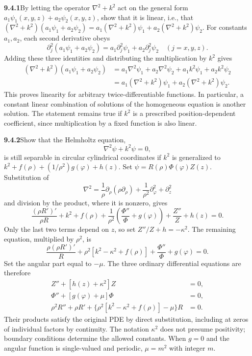 \par\bigskip
\noindent\textbf{9.4.1}\quad By letting the operator $\nabla^{2}+k^{2}$ act on
the general form $a_{1}\psi_{1}(x,y,z)+a_{2}\psi_{2}(x,y,z)$, show that it is
linear, i.e., that
$(\nabla^{2}+k^{2})(a_{1}\psi_{1}+a_{2}\psi_{2})
=a_{1}(\nabla^{2}+k^{2})\psi_{1}+a_{2}(\nabla^{2}+k^{2})\psi_{2}$.
\solution
For constants $a_1,a_2$, each second derivative obeys
\[
\partial_j^2(a_1\psi_1+a_2\psi_2)
=a_1\partial_j^2\psi_1+a_2\partial_j^2\psi_2
\quad(j=x,y,z).
\]
Adding these three identities and distributing the multiplication by
$k^2$ gives
\begin{align*}
(\nabla^2+k^2)(a_1\psi_1+a_2\psi_2)
&=a_1\nabla^2\psi_1+a_2\nabla^2\psi_2
  +a_1k^2\psi_1+a_2k^2\psi_2\\
&=a_1(\nabla^2+k^2)\psi_1+a_2(\nabla^2+k^2)\psi_2.
\end{align*}
This proves linearity for arbitrary twice-differentiable functions.
In particular, a constant linear combination of solutions of the
homogeneous equation is another solution.  The statement remains true
if $k^2$ is a prescribed position-dependent coefficient, since
multiplication by a fixed function is also linear.


\par\bigskip
\noindent\textbf{9.4.2}\quad Show that the Helmholtz equation,
\[
\nabla^{2}\psi+k^{2}\psi=0,
\]
is still separable in circular cylindrical coordinates if $k^{2}$ is
generalized to $k^{2}+f(\rho)+(1/\rho^{2})g(\varphi)+h(z)$.
\solution
Set $\psi=R(\rho)\Phi(\varphi)Z(z)$.  Substitution of
\[
\nabla^2=\frac1\rho\partial_\rho(\rho\partial_\rho)
 +\frac1{\rho^2}\partial_\varphi^2+\partial_z^2
\]
and division by the product, where it is nonzero, gives
\[
\frac{(\rho R')'}{\rho R}+k^2+f(\rho)
+\frac1{\rho^2}\left(\frac{\Phi''}{\Phi}+g(\varphi)\right)
+\frac{Z''}{Z}+h(z)=0.
\]
Only the last two terms depend on $z$, so set
$Z''/Z+h=-\kappa^2$.  The remaining equation, multiplied by $\rho^2$,
is
\[
\frac{\rho(\rho R')'}{R}+
 \rho^2[k^2-\kappa^2+f(\rho)]
+\frac{\Phi''}{\Phi}+g(\varphi)=0.
\]
Set the angular part equal to $-\mu$.  The three ordinary differential
equations are therefore
\[
\boxed{\begin{aligned}
Z''+[h(z)+\kappa^2]Z&=0,\\
\Phi''+[g(\varphi)+\mu]\Phi&=0,\\
\rho^2R''+\rho R'+\{\rho^2[k^2-\kappa^2+f(\rho)]-\mu\}R&=0.
\end{aligned}}
\]
Their products satisfy the original PDE by direct substitution,
including at zeros of individual factors by continuity.  The notation
$\kappa^2$ does not presume positivity; boundary conditions determine
the allowed constants.  When $g=0$ and the angular function is
single-valued and periodic, $\mu=m^2$ with integer $m$.


